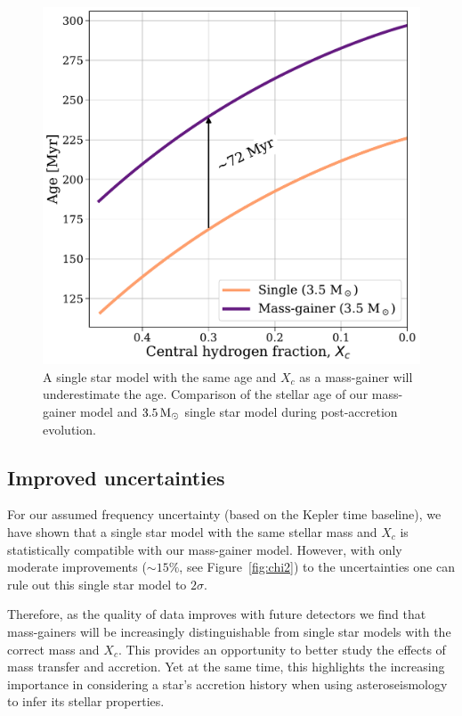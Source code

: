 \documentclass[desactivate]{aa}
\begin{document}
\begin{figure}
    \centering
    \includegraphics[width=\columnwidth]{paper/figures/age_xc_relation.pdf}
    \caption{A single star model with the same age and $X_c$ as a mass-gainer will underestimate the age. Comparison of the stellar age of our mass-gainer model and $3.5 \, {\rm M_\odot}$ single star model during post-accretion evolution.}
    \label{fig:age-Xc}
\end{figure}

\subsection{Improved uncertainties}

For our assumed frequency uncertainty (based on the Kepler time baseline), we have shown that a single star model with the same stellar mass and $X_c$ is statistically compatible with our mass-gainer model. However, with only moderate improvements (${\sim}15\%$, see Figure~\ref{fig:chi2}) to the uncertainties one can rule out this single star model to $2\sigma$.

Therefore, as the quality of data improves with future detectors we find that mass-gainers will be increasingly distinguishable from single star models with the correct mass and $X_c$. This provides an opportunity to better study the effects of mass transfer and accretion. Yet at the same time, this highlights the increasing importance in considering a star's accretion history when using asteroseismology to infer its stellar properties.
\end{document}
